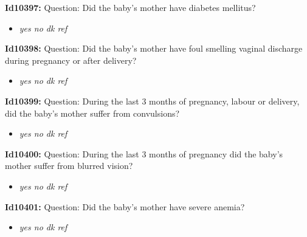 \documentclass{article}%
\begin{document}
\textbf{Id10397: \newline%
}%
Question: Did the baby's mother have diabetes mellitus?\newline%
%
\begin{itemize}%
\item%
\textit{yes\newline%
 no\newline%
 dk\newline%
 ref\newline%
}%
\end{itemize}%
\textbf{Id10398: \newline%
}%
Question: Did the baby's mother have foul smelling vaginal discharge during pregnancy or after delivery?\newline%
%
\begin{itemize}%
\item%
\textit{yes\newline%
 no\newline%
 dk\newline%
 ref\newline%
}%
\end{itemize}%
\textbf{Id10399: \newline%
}%
Question: During the last 3 months of pregnancy, labour or delivery, did the baby's mother suffer from convulsions?\newline%
%
\begin{itemize}%
\item%
\textit{yes\newline%
 no\newline%
 dk\newline%
 ref\newline%
}%
\end{itemize}%
\textbf{Id10400: \newline%
}%
Question: During the last 3 months of pregnancy did the baby's mother suffer from blurred vision?\newline%
%
\begin{itemize}%
\item%
\textit{yes\newline%
 no\newline%
 dk\newline%
 ref\newline%
}%
\end{itemize}%
\textbf{Id10401: \newline%
}%
Question: Did the baby's mother have severe anemia?\newline%
%
\begin{itemize}%
\item%
\textit{yes\newline%
 no\newline%
 dk\newline%
 ref\newline%
}%
\end{itemize}%
\end{document}
